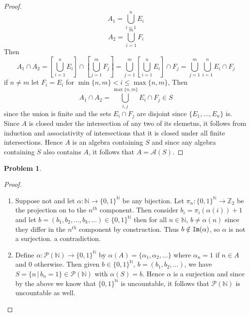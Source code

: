\documentclass{article}
\newcommand{\Z}{\mathbb{Z}}
\newcommand{\N}{\mathbb{N}}
\newtheorem{prb}{Problem}
\begin{document}
\begin{proof}
	 \[ A_1 = \bigcup_{i = 1}^n E_i \] 
	 \[ A_2 = \bigcup_{i =1}^m F_i \] 
	 Then 
	 \begin{equation}
		 A_1 \cap A_2 = \left[ \bigcup_{i = 1}^n E_i \right] \cap \left[ \bigcup_{j=1}^m F_j \right]  
		 = \bigcup_{j = 1}^m \left[\bigcup_{i = 1}^n E_i\right] \cap F_j  
		 = \bigcup_{j=1 }^m \bigcup_{i =1}^n E_i \cap F_j
	 \end{equation}
	 if $n \neq m$ let $F_i = E_i$ for $\min\{n, m\} <  i \leq \max\{n, m\}$, Then 
	 \begin{equation}
		 A_1 \cap A_2 = \bigcup_{i, j}^{\max\{n, m\}} E_i \cap F_j \in S
	 \end{equation}
	since the union is finite and the sets $E_i \cap F_j$ are disjoint since $\{E_1, \dots, E_n\}$ is. Since $A$ is closed under the intersection of any two
	of its elemetns, it follows from induction and associativity of intersections that it is closed under all finite intersections. Hence $A$ is an 
	algebra containing $S$ and since any algebra containing $S$ also contains $A$, it follows that $A = \mathcal{A}(S)$. 
\end{proof} 

\begin{prb}  \end{prb} 
\begin{proof} 
	\begin{enumerate}
		\item Suppose not and let $\alpha:\mathbb{N} \to \{0, 1\}^{\N}$ be any bijection. 
			Let \newline $\pi_n:\{0, 1\}^{\N} \to \Z_2$ be the projection on to the $n^{th}$ component. Then consider 
			$	b_i = \pi_i(\alpha(i)) +1 	$ and let $b = (b_1, b_2, \dots, b_k, \dots) \in \{0, 1\}^{\N}$ 
			then for all $n \in \N$, $b \neq \alpha(n)$ since they 
			differ in the $n^{th}$ component by construction. Thus $b \notin {\tt Im}(\alpha)$, so $\alpha$ is not 
			a surjection. a contradiction. 

		\item 
			Define 
			$\alpha: \mathcal{P}(\N) \to \{0, 1\}^\N$ by $\alpha(A) = \{ \alpha_1, \alpha_2, \dots\} $ where
			$\alpha_n = 1 $ if $n \in A$ and 0 otherwise. Then given $b \in \{0, 1\}^{\N}, 
			\, b = (b_1, b_2, \dots)$, we have $S = \{ n \, | \, b_n = 1\} \in \mathcal{P}(\N)$ with $\alpha(S) = b$. Hence
			$\alpha$ is a surjection and since by the above we know that $\{0,1 \}^\N$ is uncountable, it 
		follows that $\mathcal{P}(\N)$ is uncountable as well. 
	\end{enumerate}
\end{proof} 
\end{document}
